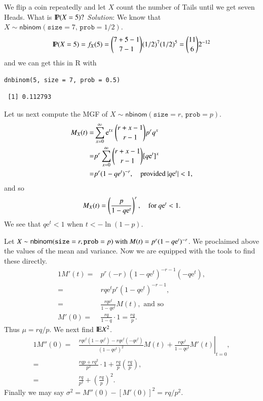 \documentclass[captions=tableheading]{scrbook}
\begin{document}
\begin{example}
We flip a coin repeatedly and let \(X\) count the number of Tails until we get seven Heads. What is \(\P(X=5)?\)
\emph{Solution}: We know that \(X\sim\mathsf{nbinom}(\mathtt{size}=7,\,\mathtt{prob}=1/2)\).
\[
\P(X=5)=f_{X}(5)={7+5-1 \choose 7-1}(1/2)^{7}(1/2)^{5}={11 \choose 6}2^{-12}
\]
and we can get this in \textsf{R} with


\begin{verbatim}
dnbinom(5, size = 7, prob = 0.5)
\end{verbatim}

\begin{verbatim}
 [1] 0.112793
\end{verbatim}

Let us next compute the MGF of \(X\sim\mathsf{nbinom}(\mathtt{size}=r,\,\mathtt{prob}=p)\).
\begin{alignat*}{1}
M_{X}(t)= & \sum_{x=0}^{\infty}\mathrm{e}^{tx}\ {r+x-1 \choose r-1}p^{r}q^{x}\\
= & p^{r}\sum_{x=0}^{\infty}{r+x-1 \choose r-1}[q\mathrm{e}^{t}]^{x}\\
= & p^{r}(1-qe^{t})^{-r},\quad\mbox{provided \ensuremath{|q\mathrm{e}^{t}|<1,}}
\end{alignat*}
and so
\begin{equation}
M_{X}(t)=\left(\frac{p}{1-q\mathrm{e}^{t}}\right)^{r},\quad\mbox{for \ensuremath{q\mathrm{e}^{t}<1}}.
\end{equation}
We see that \(q\mathrm{e}^{t}<1\) when \(t<-\ln(1-p)\).

Let \(X\sim\mathsf{nbinom}(\mathtt{size}=r,\mathtt{prob}=p)\mbox{ with \ensuremath{M(t)=p^{r}(1-q\mathrm{e}^{t})^{-r}}}\). We proclaimed above the values of the mean and variance. Now we are equipped with the tools to find these directly.
\begin{alignat*}{1}
M'(t)= & p^{r}(-r)(1-q\mathrm{e}^{t})^{-r-1}(-q\mathrm{e}^{t}),\\
= & rq\mathrm{e}^{t}p^{r}(1-q\mathrm{e}^{t})^{-r-1},\\
= & \frac{rq\mathrm{e}^{t}}{1-q\mathrm{e}^{t}}M(t),\mbox{ and so }\\
M'(0)= & \frac{rq}{1-q}\cdot1=\frac{rq}{p}.
\end{alignat*}
Thus \(\mu=rq/p\). We next find \(\E X^{2}\).
\begin{alignat*}{1}
M''(0)= & \left.\frac{rq\mathrm{e}^{t}(1-q\mathrm{e}^{t})-rq\mathrm{e}^{t}(-q\mathrm{e}^{t})}{(1-q\mathrm{e}^{t})^{2}}M(t)+\frac{rq\mathrm{e}^{t}}{1-q\mathrm{e}^{t}}M'(t)\right|_{t=0},\\
= & \frac{rqp+rq^{2}}{p^{2}}\cdot1+\frac{rq}{p}\left(\frac{rq}{p}\right),\\
= & \frac{rq}{p^{2}}+\left(\frac{rq}{p}\right)^{2}.
\end{alignat*}
Finally we may say \( \sigma^{2} = M''(0) - [M'(0)]^{2} = rq/p^{2}. \)
\end{example}
\end{document}
